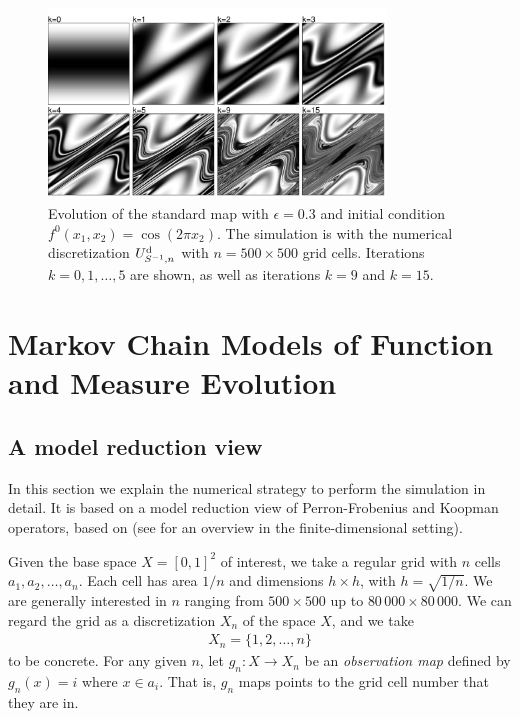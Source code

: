 \documentclass{aims}
\theoremstyle{definition}
\begin{document}
\begin{figure}
  \centerline{
    \includegraphics[width=0.8\textwidth]{standardmapevolve}
  }
  \caption{\label{standardmapevolve}Evolution of the standard map with
    $\epsilon = 0.3$ and initial condition $f^0(x_1,x_2)=\cos(2\pi
    x_2)$. The simulation is with the numerical discretization
    $U_{S^{-1},n}^{\rm d}$ with $n=500 \times 500$ grid
    cells. Iterations $k = 0,1,\ldots,5$ are shown, as well as
    iterations $k = 9$ and $k = 15$.}
\end{figure}


\section{Markov Chain Models of Function and Measure Evolution}
\label{sec:modelreduction}

\subsection{A model reduction view}

In this section we explain the numerical strategy to perform the
simulation in detail. It is based on a model reduction view of
Perron-Frobenius and Koopman operators, based on \cite{ChorinHald2,
  ChorinHald1, mori1965tcm, zwanzig1980pnt, evans2008smn,
  Froyland2001, Froyland1999} (see \cite{BeLaLiWe2009} for an overview
in the finite-dimensional setting).

Given the base space $X = [0,1]^2$ of interest, we take a regular grid
with $n$ cells $a_1,a_2,\ldots,a_n$. Each cell has area $1/n$ and
dimensions $h \times h$, with $h = \sqrt{1/n}$. We are generally
interested in $n$ ranging from $500 \times 500$ up to $80\,000 \times
80\,000$. We can regard the grid as a discretization $X_n$ of the
space $X$, and we take
\begin{align}
  \label{eqn:X_n}
  X_n = \{1,2,\ldots,n\}
\end{align}
to be concrete. For any given $n$, let $g_n : X \to X_n$ be an
\emph{observation map} defined by $g_n(x) = i$ where $x \in a_i$. That
is, $g_n$ maps points to the grid cell number that they are in.
\end{document}
